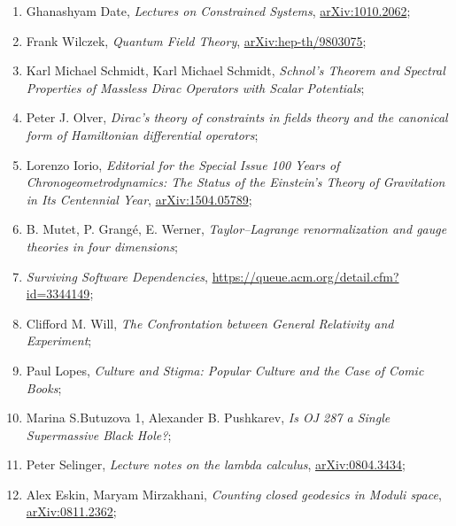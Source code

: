 \documentclass[a4paper,11pt]{article}
\begin{document}
\begin{enumerate}
\item Ghanashyam Date, \emph{Lectures on Constrained Systems},
  \href{https://arxiv.org/abs/1010.2062v1}{arXiv:1010.2062};

\item Frank Wilczek, \emph{Quantum Field Theory},
  \href{https://arxiv.org/abs/hep-th/9803075v2}{arXiv:hep-th/9803075};

\item Karl Michael Schmidt, Karl Michael Schmidt, \emph{Schnol’s
    Theorem and Spectral Properties of Massless Dirac Operators with
    Scalar Potentials};

\item Peter J. Olver, \emph{Dirac’s theory of constraints in fields
    theory and the canonical form of Hamiltonian differential
    operators};


\item Lorenzo Iorio, \emph{Editorial for the Special Issue 100 Years
    of Chronogeometrodynamics: The Status of the Einstein's Theory of
    Gravitation in Its Centennial Year},
  \href{https://arxiv.org/abs/1504.05789v2}{arXiv:1504.05789};

\item B. Mutet, P. Grang\'{e}, E. Werner, \emph{Taylor–Lagrange
    renormalization and gauge theories in four dimensions};


\item \emph{Surviving Software Dependencies},
  \href{https://queue.acm.org/detail.cfm?id=3344149}{https://queue.acm.org/detail.cfm?id=3344149};

\item Clifford M. Will, \emph{The Confrontation between General
    Relativity and Experiment};

\item Paul Lopes, \emph{Culture and Stigma: Popular Culture and the
    Case of Comic Books};

\item Marina S.Butuzova 1, Alexander B. Pushkarev, \emph{Is OJ 287 a
    Single Supermassive Black Hole?};

\item Peter Selinger, \emph{Lecture notes on the lambda calculus},
  \href{https://arxiv.org/abs/0804.3434v2}{arXiv:0804.3434};

\item Alex Eskin, Maryam Mirzakhani, \emph{Counting closed geodesics
    in Moduli space},
  \href{https://arxiv.org/abs/0811.2362v3}{arXiv:0811.2362};


\end{enumerate}
\end{document}
